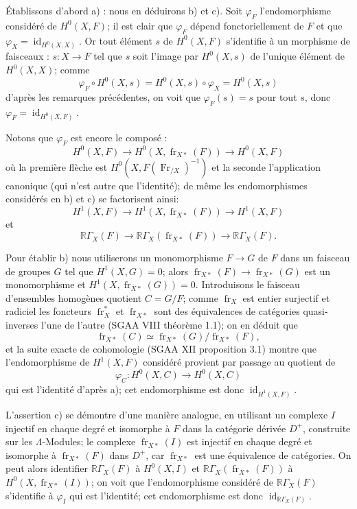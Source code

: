 \documentclass[11pt]{article}
\newcommand{\R}{\mathbb{R}}\newcommand{\RHomCore}{\mathbb{R}\mathrm{Hom}}
\providecommand{\RGamma}{\R\Gamma}
\providecommand{\id}{\operatorname{id}}
\providecommand{\id}{\operatorname{id}}
\providecommand{\id}{\operatorname{id}}
\providecommand{\RGamma}{\R\Gamma}
\providecommand{\R}{\mathrm R}
\providecommand{\id}{\operatorname{id}}
\providecommand{\id}{\operatorname{id}}
\providecommand{\fr}{\operatorname{fr}}
\providecommand{\Fr}{\operatorname{Fr}}
\providecommand{\Fr}{\operatorname{Fr}}
\providecommand{\fr}{\operatorname{fr}}
\providecommand{\id}{\operatorname{id}}
\providecommand{\RGamma}{\R\Gamma}
\begin{document}
Établissons d'abord a) : nous en déduirons b) et c). Soit $\varphi_F$ l'endomorphisme considéré de $H^0(X,F)$; il est clair que $\varphi_F$ dépend fonctoriellement de $F$ et que $\varphi_X=\id_{H^0(X,X)}$. Or tout élément $s$ de $H^0(X,F)$ s'identifie à un morphisme de faisceaux : $s:X\to F$ tel que $s$ soit l'image par $H^0(X,s)$ de l'unique élément de $H^0(X,X)$; comme
\[
\varphi_F\circ H^0(X,s)=H^0(X,s)\circ\varphi_X=H^0(X,s)
\]
d'après les remarques précédentes, on voit que $\varphi_F(s)=s$ pour tout $s$, donc $\varphi_F=\id_{H^0(X,F)}$.

Notons que $\varphi_F$ est encore le composé :
\[
H^0(X,F)\longrightarrow H^0(X,\fr_{X*}(F))
\longrightarrow H^0(X,F)
\]
où la première flèche est $H^0(X,F(\Fr_{/X})^{-1})$ et la seconde l'application canonique (qui n'est autre que l'identité); de même les endomorphismes considérés en b) et c) se factorisent ainsi:
\[
H^1(X,F)\longrightarrow H^1(X,\fr_{X*}(F))
\longrightarrow H^1(X,F)
\]
et
\[
\RGamma_X(F)\longrightarrow \RGamma_X(\fr_{X*}(F))
\longrightarrow \RGamma_X(F).
\]

Pour établir b) nous utiliserons un monomorphisme $F\to G$ de $F$ dans un faisceau de groupes $G$ tel que $H^1(X,G)=0$; alors $\fr_{X*}(F)\to\fr_{X*}(G)$ est un monomorphisme et $H^1(X,\fr_{X*}(G))=0$. Introduisons le faisceau d'ensembles homogènes quotient $C=G/F$;
comme $\fr_X$ est entier surjectif et radiciel les foncteurs $\fr_X^*$ et $\fr_{X*}$ sont des équivalences de catégories quasi-inverses l'une de l'autre (SGAA VIII théorème 1.1); on en déduit que
\[
\fr_{X*}(C)\simeq\fr_{X*}(G)/\fr_{X*}(F),
\]
et la suite exacte de cohomologie (SGAA XII proposition 3.1) montre que l'endomorphisme de $H^1(X,F)$ considéré provient par passage au quotient de
\[
\varphi_C:H^0(X,C)\longrightarrow H^0(X,C)
\]
qui est l'identité d'après a); cet endomorphisme est donc $\id_{H^1(X,F)}$.

L'assertion c) se démontre d'une manière analogue, en utilisant un complexe $I$ injectif en chaque degré et isomorphe à $F$ dans la catégorie dérivée $D^+$, construite sur les $\Lambda$-Modules; le complexe $\fr_{X*}(I)$ est injectif en chaque degré et isomorphe à $\fr_{X*}(F)$ dans $D^+$, car $\fr_{X*}$ est une équivalence de catégories. On peut alors identifier $\RGamma_X(F)$ à $H^0(X,I)$ et $\RGamma_X(\fr_{X*}(F))$ à $H^0(X,\fr_{X*}(I))$; on voit que l'endomorphisme considéré de $\RGamma_X(F)$ s'identifie à $\varphi_I$ qui est l'identité; cet endomorphisme est donc $\id_{\RGamma_X(F)}$.
\end{document}

